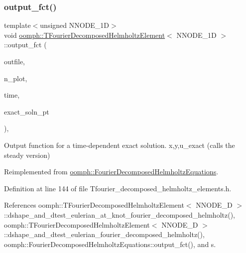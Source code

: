 \subsubsection{\texorpdfstring{output\+\_\+fct()}{output\_fct()}\hspace{0.1cm}{\footnotesize\ttfamily [2/2]}}
{\footnotesize\ttfamily template$<$unsigned N\+N\+O\+D\+E\+\_\+1D$>$ \\
void \hyperlink{classoomph_1_1TFourierDecomposedHelmholtzElement}{oomph\+::\+T\+Fourier\+Decomposed\+Helmholtz\+Element}$<$ N\+N\+O\+D\+E\+\_\+1D $>$\+::output\+\_\+fct (\begin{DoxyParamCaption}\item[{std\+::ostream \&}]{outfile,  }\item[{const unsigned \&}]{n\+\_\+plot,  }\item[{const double \&}]{time,  }\item[{\hyperlink{classoomph_1_1FiniteElement_ad4ecf2b61b158a4b4d351a60d23c633e}{Finite\+Element\+::\+Unsteady\+Exact\+Solution\+Fct\+Pt}}]{exact\+\_\+soln\+\_\+pt }\end{DoxyParamCaption})\hspace{0.3cm}{\ttfamily [inline]}, {\ttfamily [virtual]}}



Output function for a time-\/dependent exact solution. x,y,u\+\_\+exact (calls the steady version) 



Reimplemented from \hyperlink{classoomph_1_1FourierDecomposedHelmholtzEquations_a4a094945d74be0e025895f240d4b0072}{oomph\+::\+Fourier\+Decomposed\+Helmholtz\+Equations}.



Definition at line 144 of file Tfourier\+\_\+decomposed\+\_\+helmholtz\+\_\+elements.\+h.



References oomph\+::\+T\+Fourier\+Decomposed\+Helmholtz\+Element$<$ N\+N\+O\+D\+E\+\_\+D $>$\+::dshape\+\_\+and\+\_\+dtest\+\_\+eulerian\+\_\+at\+\_\+knot\+\_\+fourier\+\_\+decomposed\+\_\+helmholtz(), oomph\+::\+T\+Fourier\+Decomposed\+Helmholtz\+Element$<$ N\+N\+O\+D\+E\+\_\+D $>$\+::dshape\+\_\+and\+\_\+dtest\+\_\+eulerian\+\_\+fourier\+\_\+decomposed\+\_\+helmholtz(), oomph\+::\+Fourier\+Decomposed\+Helmholtz\+Equations\+::output\+\_\+fct(), and s.

\mbox{\label{classoomph_1_1TFourierDecomposedHelmholtzElement_ad1275febec81a4962ccfee449f2cf391}} 
